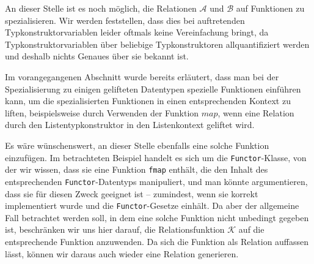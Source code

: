 An dieser Stelle ist es noch möglich, die Relationen $\mathcal{A}$ und $\mathcal{B}$ auf Funktionen zu spezialisieren. Wir werden
feststellen, dass dies bei auftretenden Typkonstruktorvariablen leider oftmals keine Vereinfachung bringt, da Typkonstruktorvariablen
über beliebige Typkonstruktoren allquantifiziert werden und deshalb nichts Genaues über sie bekannt ist.

Im vorangegangenen Abschnitt wurde bereits erläutert, dass man bei der Spezialisierung zu einigen gelifteten Datentypen
spezielle Funktionen einführen kann, um die spezialisierten Funktionen in einen entsprechenden Kontext zu liften, beispielsweise
durch Verwenden der Funktion $map$, wenn eine Relation durch den Listentypkonstruktor in den Listenkontext geliftet wird.

Es wäre wünschenswert, an dieser Stelle ebenfalls eine solche Funktion einzufügen. Im betrachteten Beispiel handelt es sich um die
\texttt{Functor}-Klasse, von der wir wissen, dass sie eine Funktion \texttt{fmap} enthält, die den Inhalt des entsprechenden
\texttt{Functor}-Datentyps manipuliert, und man könnte argumentieren, dass sie für diesen Zweck geeignet ist -- zumindest, wenn sie
korrekt implementiert wurde und die \texttt{Functor}-Gesetze einhält. Da aber der allgemeine Fall betrachtet werden soll, in dem
eine solche Funktion nicht unbedingt gegeben ist, beschränken wir uns hier darauf,
die Relationsfunktion $\mathcal{K}$ auf
die entsprechende Funktion anzuwenden. Da sich die Funktion als Relation auffassen lässt, können wir daraus auch wieder
eine Relation generieren.


